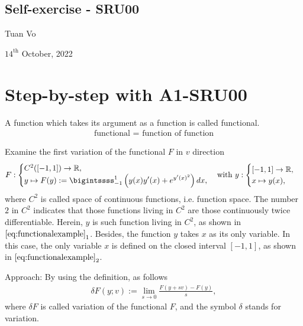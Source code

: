 \documentclass[12pt]{article}
\begin{document}
\begin{center}
	\section*{Self-exercise - SRU00}
\end{center}
\begin{center}
	Tuan Vo
\end{center}
\begin{center}
	$14^{\text{th}}$ October, 2022
\end{center}
\section{Step-by-step with A1-SRU00}
A function which takes its argument as a function is called 
functional.
\begin{align}
	\boxed{
		\text{functional = function of function}
	}
\end{align}
\begin{exampleboxed}
	Examine the first variation of the functional $F$ in $v$ direction
	\begin{align}
		\label{eq:functionalexample}
		F:
		\begin{cases}
			C^2([-1,1]) \rightarrow \mathbb{R}, \\
			\displaystyle
			y \mapsto
			F(y):= \bigintssss_{-1}^1
			\left( y(x) y'(x) + e^{{y^\prime}(x)^2} \right)dx,
		\end{cases}
		\text{with}\
		y:
		\begin{cases}
			[-1,1] \rightarrow \mathbb{R}, \\
			x \mapsto y(x),
		\end{cases}
	\end{align}
	where $C^2$ is called space of continuous functions, i.e. function space.
	The number $2$ in $C^2$ indicates that those functions
	living in $C^2$ are those continuously twice differentiable.
	Herein, $y$ is such function living in $C^2$,
	as shown in $\eqref{eq:functionalexample}_{1}$.
	Besides, the function $y$ takes $x$ as its only variable.
	In this case, the only variable $x$
	is defined on the closed interval $[-1,1]$, as shown in
	$\eqref{eq:functionalexample}_{2}$.
\end{exampleboxed}

Approach: By using the definition, as follows 
\begin{align}
	\label{eq:variationformular}
	\boxed{
		\delta F(y;v) := \lim_{s\to 0}\frac{F(y+sv)-F(y)}{s},
	}
\end{align}
where $\delta F$ is called variation of the functional $F$, 
and the symbol $\delta$ stands for variation.
\end{document}
